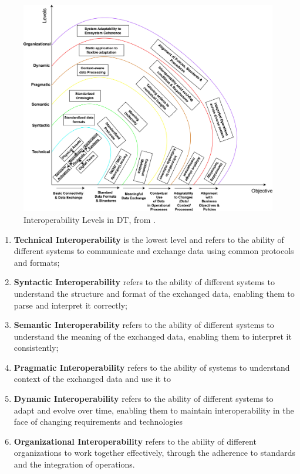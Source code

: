 \begin{figure}[ht]
    \centering
    \includegraphics[width=\textwidth]{figures/interoperability-levels.jpg}
    \caption{Interoperability Levels in \acl{DT}, from \cite{Acharya_Khan_Päivärinta_2024}.}
    \label{fig:dt-interoperability-levels}
\end{figure}


\begin{enumerate}
    \item \textbf{Technical Interoperability} is the lowest level and refers to the ability of different systems to communicate and exchange data using common protocols and formats;
    \item \textbf{Syntactic Interoperability} refers to the ability of different systems to understand the structure and format of the exchanged data, enabling them to parse and interpret it correctly;
    \item \textbf{Semantic Interoperability} refers to the ability of different systems to understand the meaning of the exchanged data, enabling them to interpret it consistently;
    \item \textbf{Pragmatic Interoperability} refers to the ability of systems to understand context of the exchanged data and use it to 
    \item \textbf{Dynamic Interoperability} refers to the ability of different systems to adapt and evolve over time, enabling them to maintain interoperability in the face of changing requirements and technologies
    \item \textbf{Organizational Interoperability} refers to the ability of different organizations to work together effectively, through the adherence to standards and the integration of operations. 
\end{enumerate}
%

